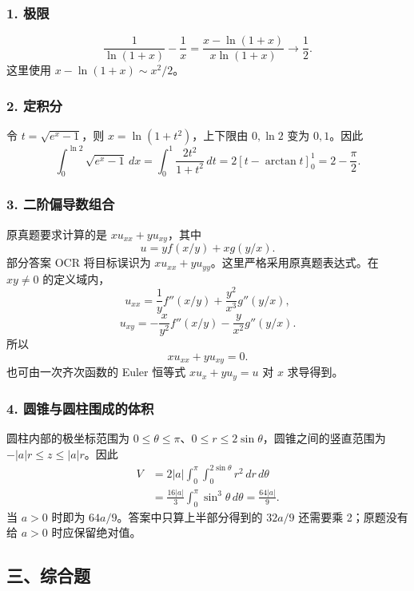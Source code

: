 \documentclass[11pt,fontset=fandol]{ctexart}
\begin{document}
\subsubsection{1. 极限}\label{ux6781ux9650}

\[
\frac1{\ln(1+x)}-\frac1x
=\frac{x-\ln(1+x)}{x\ln(1+x)}\longrightarrow\boxed{\frac12}.
\] 这里使用 \(x-\ln(1+x)\sim x^2/2\)。

\subsubsection{2. 定积分}\label{ux5b9aux79efux5206}

令 \(t=\sqrt{e^x-1}\)，则 \(x=\ln(1+t^2)\)，上下限由 \(0,\ln2\) 变为
\(0,1\)。因此 \[
\boxed{\int_0^{\ln2}\sqrt{e^x-1}\,dx
=\int_0^1\frac{2t^2}{1+t^2}\,dt
=2[t-\arctan t]_0^1=2-\frac\pi2.}
\]

\subsubsection{3.
二阶偏导数组合}\label{ux4e8cux9636ux504fux5bfcux6570ux7ec4ux5408}

原真题要求计算的是 \(xu_{xx}+yu_{xy}\)，其中 \[
u=yf(x/y)+xg(y/x).
\] 部分答案 OCR 将目标误识为
\(xu_{xx}+yu_{yy}\)。这里严格采用原真题表达式。在 \(xy\neq0\)
的定义域内， \[
u_{xx}=\frac1y f''(x/y)+\frac{y^2}{x^3}g''(y/x),
\] \[
u_{xy}=-\frac{x}{y^2}f''(x/y)-\frac{y}{x^2}g''(y/x).
\] 所以 \[
\boxed{xu_{xx}+yu_{xy}=0.}
\] 也可由一次齐次函数的 Euler 恒等式 \(xu_x+yu_y=u\) 对 \(x\) 求导得到。

\subsubsection{4.
圆锥与圆柱围成的体积}\label{ux5706ux9525ux4e0eux5706ux67f1ux56f4ux6210ux7684ux4f53ux79ef}

圆柱内部的极坐标范围为
\(0\leq\theta\leq\pi\)、\(0\leq r\leq2\sin\theta\)，圆锥之间的竖直范围为
\(-|a|r\leq z\leq|a|r\)。因此 \[
\begin{aligned}
V&=2|a|\int_0^\pi\int_0^{2\sin\theta}r^2\,dr\,d\theta\\
&=\frac{16|a|}{3}\int_0^\pi\sin^3\theta\,d\theta
=\boxed{\frac{64|a|}{9}}.
\end{aligned}
\] 当 \(a>0\) 时即为 \(64a/9\)。答案中只算上半部分得到的 \(32a/9\)
还需要乘 2；原题没有给 \(a>0\) 时应保留绝对值。

\subsection{三、综合题}\label{ux4e09ux7efcux5408ux9898}
\end{document}
